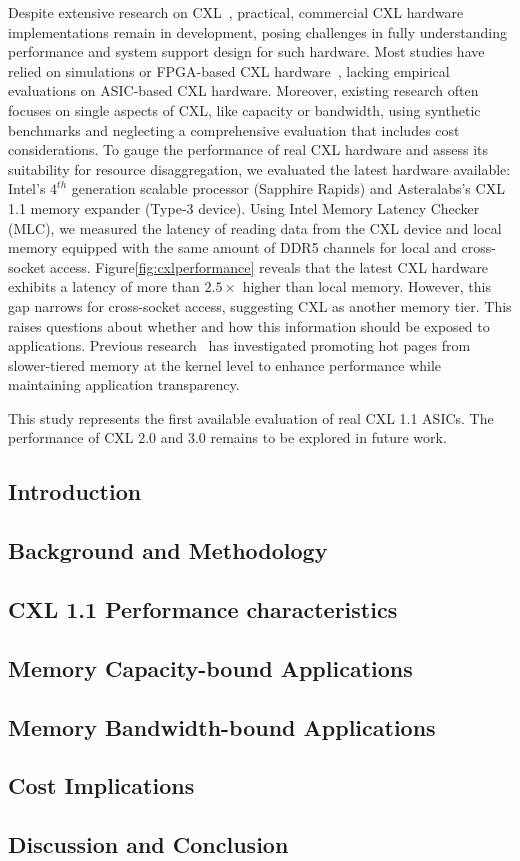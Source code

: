 Despite extensive research on CXL~\cite{cxl_azure,cxlcentric,demystify}, practical, commercial CXL hardware implementations remain in development, posing challenges in fully understanding performance and system support design for such hardware. Most studies have relied on simulations or FPGA-based CXL hardware~\cite{demystify,intelfpga}, lacking empirical evaluations on ASIC-based CXL hardware. Moreover, existing research often focuses on single aspects of CXL, like capacity or bandwidth, using synthetic benchmarks and neglecting a comprehensive evaluation that includes cost considerations. To gauge the performance of real CXL hardware and assess its suitability for resource disaggregation, we evaluated the latest hardware available: Intel's $\text{4}^{th}$ generation scalable processor (Sapphire Rapids) and Asteralabs's CXL 1.1 memory expander (Type-3 device). Using Intel Memory Latency Checker (MLC)\cite{mlc}, we measured the latency of reading data from the CXL device and local memory equipped with the same amount of DDR5 channels for local and cross-socket access. Figure\ref{fig:cxlperformance} reveals that the latest CXL hardware exhibits a latency of more than $2.5\times$ higher than local memory. However, this gap narrows for cross-socket access, suggesting CXL as another memory tier. This raises questions about whether and how this information should be exposed to applications. Previous research~\cite{tpp} has investigated promoting hot pages from slower-tiered memory at the kernel level to enhance performance while maintaining application transparency.

This study represents the first available evaluation of real CXL 1.1 ASICs. The performance of CXL 2.0 and 3.0 remains to be explored in future work.

\subsection{Introduction}
\subsection{Background and Methodology}
\subsection{CXL 1.1 Performance characteristics}
\subsection{Memory Capacity-bound Applications}

\subsection{Memory Bandwidth-bound Applications}

\subsection{Cost Implications}

\subsection{Discussion and Conclusion}
